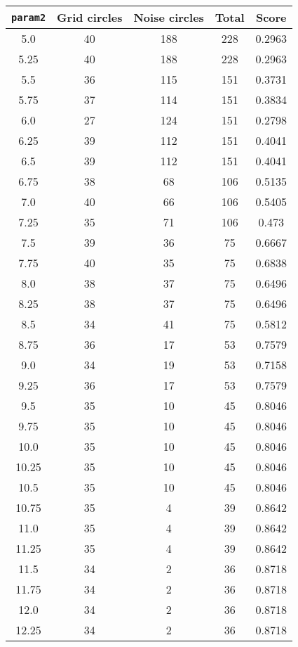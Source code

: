 \documentclass[letterpaper, 12pt]{article}
\begin{document}
\begin{longtable}{|c|c|c|c|c|}
\hline
\textbf{\texttt{param2}} & \textbf{Grid circles} & \textbf{Noise circles} & \textbf{Total} & \textbf{Score} \\
\hline
5.0 & 40 & 188 & 228 & 0.2963 \\
\hline
5.25 & 40 & 188 & 228 & 0.2963 \\
\hline
5.5 & 36 & 115 & 151 & 0.3731 \\
\hline
5.75 & 37 & 114 & 151 & 0.3834 \\
\hline
6.0 & 27 & 124 & 151 & 0.2798 \\
\hline
6.25 & 39 & 112 & 151 & 0.4041 \\
\hline
6.5 & 39 & 112 & 151 & 0.4041 \\
\hline
6.75 & 38 & 68 & 106 & 0.5135 \\
\hline
7.0 & 40 & 66 & 106 & 0.5405 \\
\hline
7.25 & 35 & 71 & 106 & 0.473 \\
\hline
7.5 & 39 & 36 & 75 & 0.6667 \\
\hline
7.75 & 40 & 35 & 75 & 0.6838 \\
\hline
8.0 & 38 & 37 & 75 & 0.6496 \\
\hline
8.25 & 38 & 37 & 75 & 0.6496 \\
\hline
8.5 & 34 & 41 & 75 & 0.5812 \\
\hline
8.75 & 36 & 17 & 53 & 0.7579 \\
\hline
9.0 & 34 & 19 & 53 & 0.7158 \\
\hline
9.25 & 36 & 17 & 53 & 0.7579 \\
\hline
9.5 & 35 & 10 & 45 & 0.8046 \\
\hline
9.75 & 35 & 10 & 45 & 0.8046 \\
\hline
10.0 & 35 & 10 & 45 & 0.8046 \\
\hline
10.25 & 35 & 10 & 45 & 0.8046 \\
\hline
10.5 & 35 & 10 & 45 & 0.8046 \\
\hline
10.75 & 35 & 4 & 39 & 0.8642 \\
\hline
11.0 & 35 & 4 & 39 & 0.8642 \\
\hline
11.25 & 35 & 4 & 39 & 0.8642 \\
\hline
11.5 & 34 & 2 & 36 & 0.8718 \\
\hline
11.75 & 34 & 2 & 36 & 0.8718 \\
\hline
12.0 & 34 & 2 & 36 & 0.8718 \\
\hline
12.25 & 34 & 2 & 36 & 0.8718 \\

\end{longtable}
\end{document}
